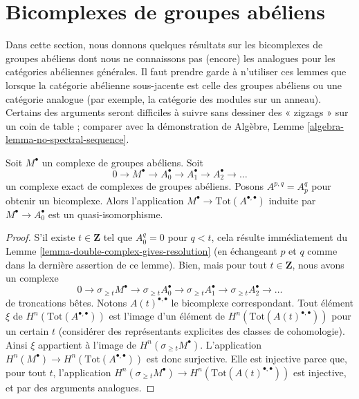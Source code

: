 \section{Bicomplexes de groupes abéliens}
\label{section-double-complexes-abelian-groups}

\noindent
Dans cette section, nous donnons quelques résultats sur les bicomplexes
de groupes abéliens dont nous ne connaissons pas (encore) les analogues
pour les catégories abéliennes générales. Il faut prendre garde à n'utiliser
ces lemmes que lorsque la catégorie abélienne sous-jacente est celle des
groupes abéliens ou une catégorie analogue (par exemple, la catégorie des
modules sur un anneau). Certains des arguments seront difficiles à suivre
sans dessiner des « zigzags » sur un coin de table ; comparer avec la
démonstration de
Algèbre, Lemme \ref{algebra-lemma-no-spectral-sequence}.

\begin{lemma}
\label{lemma-right-resolution-gives-qis}
Soit $M^\bullet$ un complexe de groupes abéliens. Soit
$$
0 \to M^\bullet \to A_0^\bullet \to A_1^\bullet \to A_2^\bullet \to \ldots
$$
un complexe exact de complexes de groupes abéliens. Posons
$A^{p, q} = A_p^q$ pour obtenir un bicomplexe.
Alors l'application $M^\bullet \to \text{Tot}(A^{\bullet, \bullet})$
induite par $M^\bullet \to A_0^\bullet$ est un quasi-isomorphisme.
\end{lemma}

\begin{proof}
S'il existe $t \in \mathbf{Z}$ tel que $A_0^q = 0$ pour $q < t$, cela résulte
immédiatement du
Lemme \ref{lemma-double-complex-gives-resolution}
(en échangeant $p$ et $q$ comme dans la dernière assertion de ce lemme).
Bien, mais pour tout $t \in \mathbf{Z}$, nous avons un complexe
$$
0 \to
\sigma_{\geq t}M^\bullet \to
\sigma_{\geq t}A_0^\bullet \to
\sigma_{\geq t}A_1^\bullet \to
\sigma_{\geq t}A_2^\bullet \to \ldots
$$
de troncations bêtes. Notons $A(t)^{\bullet, \bullet}$ le bicomplexe
correspondant. Tout élément $\xi$ de $H^n(\text{Tot}(A^{\bullet, \bullet}))$
est l'image d'un élément de $H^n(\text{Tot}(A(t)^{\bullet, \bullet}))$
pour un certain $t$ (considérer des représentants explicites des classes
de cohomologie). Ainsi $\xi$ appartient à l'image de
$H^n(\sigma_{\geq t}M^\bullet)$.
L'application $H^n(M^\bullet) \to H^n(\text{Tot}(A^{\bullet, \bullet}))$
est donc surjective. Elle est injective parce que, pour tout $t$, l'application
$H^n(\sigma_{\geq t}M^\bullet) \to H^n(\text{Tot}(A(t)^{\bullet, \bullet}))$
est injective, et par des arguments analogues.
\end{proof}

